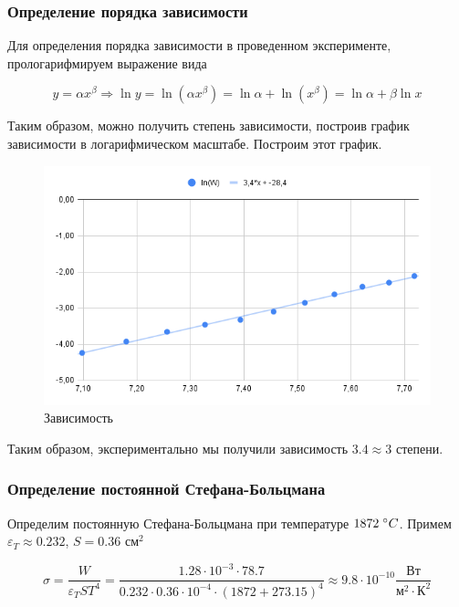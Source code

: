 \documentclass[12pt]{article}
\begin{document}
      \subsubsection{Определение порядка зависимости}

        Для определения порядка зависимости в проведенном эксперименте,
        прологарифмируем выражение вида

        $$
          y = \alpha x^{\beta} \Rightarrow
          \ln y = \ln \left(\alpha x^{\beta}\right) =
          \ln \alpha + \ln \left(x^{\beta}\right) =
          \ln \alpha + \beta \ln x
        $$

        Таким образом, можно получить степень зависимости, построив график
        зависимости в логарифмическом масштабе. Построим этот график.

        \newpage
        \begin{figure}[h]
            \centering
            \includegraphics[width=0.7\linewidth]{st-bm.png}
            \caption{Зависимость}
            \label{fig:plot}
        \end{figure}

        Таким образом, экспериментально мы получили зависимость $3.4 \approx 3$
        степени.

      \subsubsection{Определение постоянной Стефана-Больцмана}

        Определим постоянную Стефана-Больцмана при температуре
        $1872 \hspace{0.1cm} ^{\circ} C$. Примем $\varepsilon_T \approx 0.232$,
        $S = 0.36$ $см^2$

        $$
          \sigma = \frac{W}{\varepsilon_T S T^4} =
          \frac{1.28 \cdot 10^{-3} \cdot 78.7}
          {0.232 \cdot 0.36 \cdot 10^{-4} \cdot (1872 + 273.15)^4} \approx
          9.8 \cdot 10^{-10} \frac{Вт}{м^2 \cdot К^2}
        $$
\end{document}
